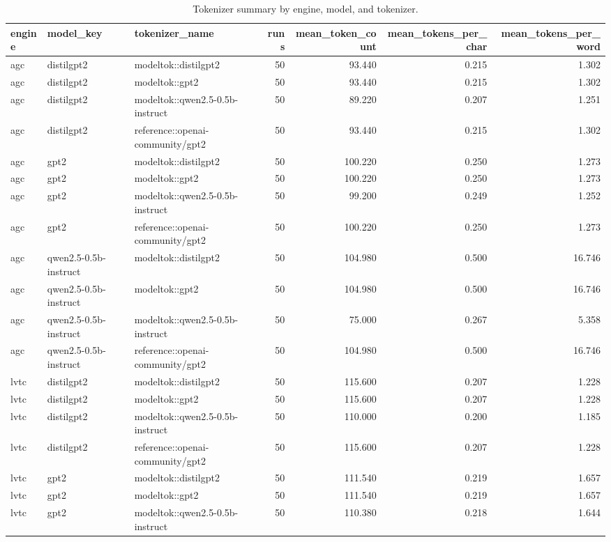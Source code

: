 \begin{table}[t]
\centering
\caption{Tokenizer summary by engine, model, and tokenizer.}
\label{tab:tokenizer_summary}
\begin{tabular}{lllrrrr}
\toprule
engine & model\_key & tokenizer\_name & runs & mean\_token\_count & mean\_tokens\_per\_char & mean\_tokens\_per\_word \\
\midrule
agc & distilgpt2 & modeltok::distilgpt2 & 50 & 93.440 & 0.215 & 1.302 \\
agc & distilgpt2 & modeltok::gpt2 & 50 & 93.440 & 0.215 & 1.302 \\
agc & distilgpt2 & modeltok::qwen2.5-0.5b-instruct & 50 & 89.220 & 0.207 & 1.251 \\
agc & distilgpt2 & reference::openai-community/gpt2 & 50 & 93.440 & 0.215 & 1.302 \\
agc & gpt2 & modeltok::distilgpt2 & 50 & 100.220 & 0.250 & 1.273 \\
agc & gpt2 & modeltok::gpt2 & 50 & 100.220 & 0.250 & 1.273 \\
agc & gpt2 & modeltok::qwen2.5-0.5b-instruct & 50 & 99.200 & 0.249 & 1.252 \\
agc & gpt2 & reference::openai-community/gpt2 & 50 & 100.220 & 0.250 & 1.273 \\
agc & qwen2.5-0.5b-instruct & modeltok::distilgpt2 & 50 & 104.980 & 0.500 & 16.746 \\
agc & qwen2.5-0.5b-instruct & modeltok::gpt2 & 50 & 104.980 & 0.500 & 16.746 \\
agc & qwen2.5-0.5b-instruct & modeltok::qwen2.5-0.5b-instruct & 50 & 75.000 & 0.267 & 5.358 \\
agc & qwen2.5-0.5b-instruct & reference::openai-community/gpt2 & 50 & 104.980 & 0.500 & 16.746 \\
lvtc & distilgpt2 & modeltok::distilgpt2 & 50 & 115.600 & 0.207 & 1.228 \\
lvtc & distilgpt2 & modeltok::gpt2 & 50 & 115.600 & 0.207 & 1.228 \\
lvtc & distilgpt2 & modeltok::qwen2.5-0.5b-instruct & 50 & 110.000 & 0.200 & 1.185 \\
lvtc & distilgpt2 & reference::openai-community/gpt2 & 50 & 115.600 & 0.207 & 1.228 \\
lvtc & gpt2 & modeltok::distilgpt2 & 50 & 111.540 & 0.219 & 1.657 \\
lvtc & gpt2 & modeltok::gpt2 & 50 & 111.540 & 0.219 & 1.657 \\
lvtc & gpt2 & modeltok::qwen2.5-0.5b-instruct & 50 & 110.380 & 0.218 & 1.644 \\

\end{tabular}
\end{table}
